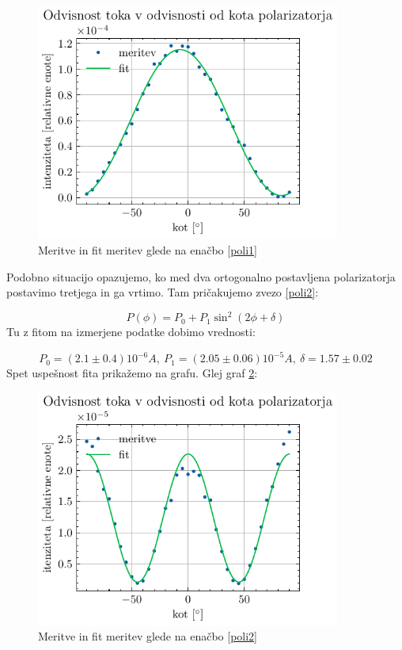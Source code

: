 \documentclass[12pt]{article}
\begin{document}
\begin{figure}[ht]
\begin{center}
    \includegraphics[width=10cm]{poli1.pdf}
    \caption{Meritve in fit meritev glede na enačbo \ref{poli1}}
    \label{1poli}
\end{center}
\end{figure}

Podobno situacijo opazujemo, ko med dva ortogonalno postavljena polarizatorja postavimo tretjega in ga vrtimo. Tam pričakujemo zvezo \ref{poli2}:

\begin{equation}
    P(\phi) = P_0 + P_1 \sin ^2 \left(2\phi + \delta\right)
    \label{poli2}
\end{equation}
Tu z fitom na izmerjene podatke dobimo vrednosti:

\begin{equation*}
    P_0 = (2.1 \pm 0.4) 10^{-6} A,\ P_1 = (2.05\pm 0.06) 10^{-5} A, \ \delta = 1.57 \pm 0.02
\end{equation*}
Spet uspešnost fita prikažemo na grafu. Glej graf \ref{2poli}:

\begin{figure}[ht]
\begin{center}
    \includegraphics[width=10cm]{poli2.pdf}
    \caption{Meritve in fit meritev glede na enačbo \ref{poli2}}
    \label{2poli}
\end{center}
\end{figure}
\end{document}
